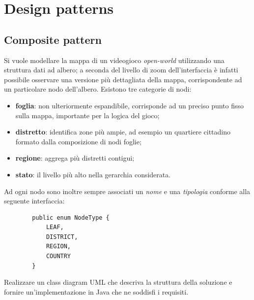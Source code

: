 \documentclass[12pt,a4paper]{article}
\begin{document}
	
\section{Design patterns}
    \subsection{Composite pattern}\label{patter:composite}
    
    \begin{Exercise}\label{composite:ex1}
    Si vuole modellare la mappa di un videogioco \textit{open-world} utilizzando una struttura dati ad albero; a seconda del livello di zoom dell'interfaccia è infatti possibile osservare una versione più dettagliata della mappa, corrispondente ad un particolare nodo dell'albero.
    Esistono tre categorie di nodi:
    \begin{itemize}
        \item \textbf{foglia}: non ulteriormente espandibile, corrisponde ad un preciso punto fisso sulla mappa, importante per la logica del gioco;
        \item \textbf{distretto}: identifica zone più ampie, ad esempio un quartiere cittadino formato dalla composizione di nodi foglie;
        \item \textbf{regione}: aggrega più distretti contigui;
        \item \textbf{stato}: il livello più alto nella gerarchia considerata.
    \end{itemize}
    Ad ogni nodo sono inoltre sempre associati un \textit{nome} e una \textit{tipologia} conforme alla seguente interfaccia:

    \begin{lstlisting}
        public enum NodeType {
            LEAF,
            DISTRICT,
            REGION,
            COUNTRY
        }
    \end{lstlisting}
    
    Realizzare un class diagram UML che descriva la struttura della soluzione e fornire un'implementazione in Java che ne soddisfi i requisiti.
    \end{Exercise}

\end{document}
